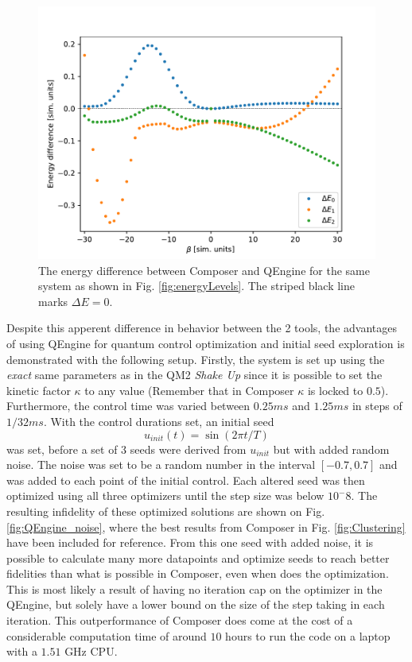 \documentclass[a4paper, twocolumn]{revtex4-1}
\begin{document}
\begin{figure}
	\includegraphics[width=\columnwidth]{graphics/stateAnalysis/energyDiffQEngineComp.pdf}
	\caption{The energy difference between Composer and QEngine for the same system as shown in Fig. \ref{fig:energyLevels}. The striped black line marks $\Delta E=0$.}
	\label{fig:QEngine_energydiff}
\end{figure}

Despite this apperent difference in behavior between the 2 tools, the advantages of using QEngine for quantum control optimization and initial seed exploration is demonstrated with the following setup. Firstly, the system is set up using the \textit{exact} same parameters as in the QM2 \textit{Shake Up} since it is possible to set the kinetic factor $\kappa$ to any value (Remember that in Composer $\kappa$ is locked to $0.5$). Furthermore, the control time was varied between $0.25 ms$ and $1.25 ms$ in steps of $1/32 ms$. With the control durations set, an initial seed 
\begin{equation}
	u_{init}(t) = \sin(2\pi t/T)
\end{equation}
was set, before a set of 3 seeds were derived from $u_{init}$ but with added random noise. The noise was set to be a random number in the interval $[-0.7, 0.7]$ and was added to each point of the initial control. Each altered seed was then optimized using all three optimizers until the step size was below $10^-8$. The resulting infidelity of these optimized solutions are shown on Fig. \ref{fig:QEngine_noise}, where the best results from Composer in Fig. \ref{fig:Clustering} have been included for reference. From this one seed with added noise, it is possible to calculate many more datapoints and optimize seeds to reach better fidelities than what is possible in Composer, even when  does the optimization. This is most likely a result of having no iteration cap on the optimizer in the QEngine, but solely have a lower bound on the size of the step taking in each iteration. This outperformance of Composer does come at the cost of a considerable computation time of around $10$ hours to run the code on a laptop with a $1.51$ GHz CPU.
\end{document}
